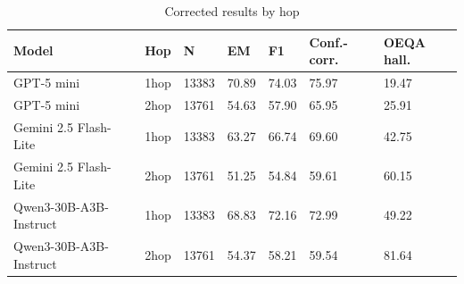 \begin{table}[t]
\centering
\small
\begin{tabular}{lllllll}
\toprule
Model & Hop & N & EM & F1 & Conf.-corr. & OEQA hall. \\
\midrule
GPT-5 mini & 1hop & 13383 & 70.89 & 74.03 & 75.97 & 19.47 \\
GPT-5 mini & 2hop & 13761 & 54.63 & 57.90 & 65.95 & 25.91 \\
Gemini 2.5 Flash-Lite & 1hop & 13383 & 63.27 & 66.74 & 69.60 & 42.75 \\
Gemini 2.5 Flash-Lite & 2hop & 13761 & 51.25 & 54.84 & 59.61 & 60.15 \\
Qwen3-30B-A3B-Instruct & 1hop & 13383 & 68.83 & 72.16 & 72.99 & 49.22 \\
Qwen3-30B-A3B-Instruct & 2hop & 13761 & 54.37 & 58.21 & 59.54 & 81.64 \\
\bottomrule
\end{tabular}
\caption{Corrected results by hop}
\label{tab:core-v11-corrected-results-by-hop}
\end{table}
